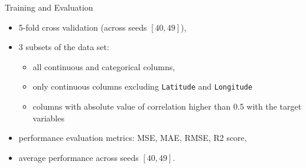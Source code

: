 \documentclass[xcolor=table]{beamer} %
\begin{document}
\begin{frame}{Training and Evaluation}
  \vspace{-1cm}
  \begin{itemize}
      \item 5-fold cross validation (across seeds $[40, 49]$),
      \item 3 subsets of the data set:
        \begin{itemize}
            \item all continuous and categorical columns,
            \item only continuous columns excluding \texttt{Latitude} and \texttt{Longitude}
            \item columns with absolute value of correlation higher than 0.5 with the target variables
        \end{itemize}
      \item performance evaluation metrics: MSE, MAE, RMSE, R2 score,
      \item average performance across seeds $[40, 49]$.
  \end{itemize}
\end{frame}
\end{document}
